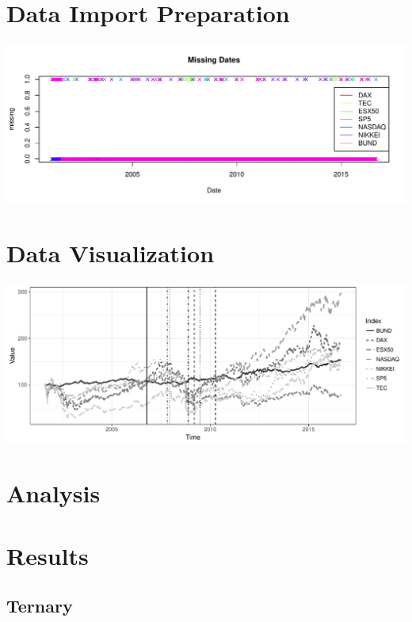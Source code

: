 \documentclass{scrbook}
\begin{document}
\chapter{Data Import Preparation}
\includegraphics[width=\textwidth]{missingDates.pdf}


\chapter{Data Visualization}
\includegraphics[width=\textwidth]{retPlot.pdf}






\chapter{Analysis}




\chapter{Results}

\section{Ternary}
\clearpage




\end{document}
